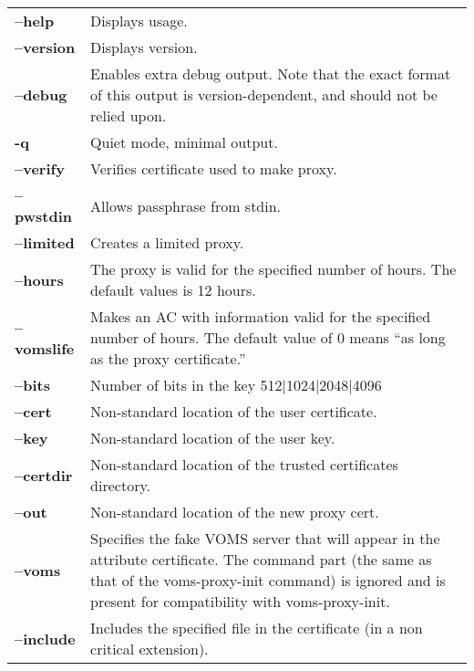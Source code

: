 \documentclass[a4paper]{book}
\begin{document}
\begin{longtable}{lp{3in}}

\textbf{--help}         & Displays usage.\\
\textbf{--version}      & Displays version.\\
\textbf{--debug}        & Enables extra debug output.  Note that the
                          exact format of this output is
                          version-dependent, and should not be relied
                          upon.\\
\textbf{-q}             & Quiet mode, minimal output.\\
\textbf{--verify}       & Verifies certificate used to make proxy.\\
\textbf{--pwstdin}      & Allows passphrase from stdin.\\
\textbf{--limited}      & Creates a limited proxy.\\
\textbf{--hours}        & The proxy is valid for the specified number
                          of hours.  The default values is 12 hours.\\
\textbf{--vomslife}     & Makes an AC with information valid for the
                          specified number of hours.  The default
                          value of 0 means ``as long as the proxy
                          certificate.''\\
\textbf{--bits}         & Number of bits in the key {512|1024|2048|4096}\\
\textbf{--cert}         & Non-standard location of the user certificate.\\
\textbf{--key}          & Non-standard location of the user key.\\
\textbf{--certdir}      & Non-standard location of the trusted
                          certificates directory.\\
\textbf{--out}          & Non-standard location of the new proxy
                          cert.\\
\textbf{--voms}         & Specifies the fake VOMS server that will
                          appear in the attribute certificate.  The
                          command part (the same as that of the
                          voms-proxy-init command) is ignored and is
                          present for compatibility with
                          voms-proxy-init.\\
\textbf{--include}      & Includes the specified file in the
                          certificate (in a non critical extension).\\

\end{longtable}
\end{document}
